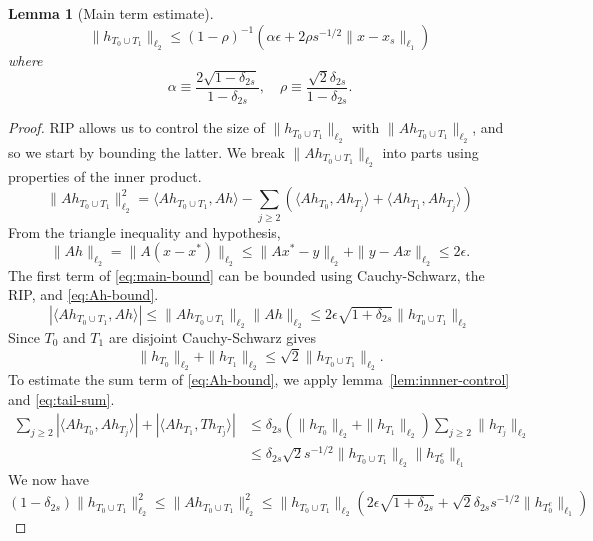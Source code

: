 \documentclass{article}
\newtheorem{lemma}[theorem]{Lemma}
\theoremstyle{definition}
\begin{document}
\begin{lemma}[Main term estimate]\label{lem:main-estimate}
\begin{equation}\label{eq:main-term-est}
\|h_{T_0\cup T_1}\|_{\ell_2} \leq (1 - \rho)^{-1}(\alpha\epsilon + 2\rho s^{-1/2}\|x - x_s\|_{\ell_1})
\end{equation}
where
$$
\alpha \equiv \frac{2\sqrt{1 - \delta_{2s}}}{1 - \delta_{2s}},\quad \rho \equiv \frac{\sqrt{2}\delta_{2s}}{1 - \delta_{2s}}.
$$
\end{lemma}
\begin{proof}
RIP allows us to control the size of $\|h_{T_0\cup T_1}\|_{\ell_2}$ with $\|Ah_{T_0\cup T_1}\|_{\ell_2}$, and so we start by bounding the latter. We break $\|Ah_{T_0\cup T_1}\|_{\ell_2}$ into parts using properties of the inner product.
\begin{equation}\label{eq:main-bound}
\|Ah_{T_0\cup T_1}\|_{\ell_2}^2 = \langle A h_{T_0\cup T_1}, Ah \rangle - \sum_{j \geq 2}\left(\langle A h_{T_0}, Ah_{T_j}\rangle + \langle Ah_{T_1}, Ah_{T_j}\rangle\right)
\end{equation}
From the triangle inequality and hypothesis,
\begin{equation}\label{eq:Ah-bound}
\|Ah\|_{\ell_2} = \|A(x - x^*)\|_{\ell_2} \leq \|Ax^* - y\|_{\ell_2} + \|y - Ax\|_{\ell_2} \leq 2\epsilon.
\end{equation}
The first term of \eqref{eq:main-bound} can be bounded using Cauchy-Schwarz, the RIP, and \eqref{eq:Ah-bound}.
\begin{equation}\label{eq:first-term-est}
|\langle Ah_{T_0\cup T_1}, Ah\rangle| \leq \|Ah_{T_0\cup T_1}\|_{\ell_2}\|Ah\|_{\ell_2} \leq 2\epsilon \sqrt{1 + \delta_{2s}}\|h_{T_0\cup T_1}\|_{\ell_2}
\end{equation}
Since $T_0$ and $T_1$ are disjoint Cauchy-Schwarz gives
$$
\|h_{T_0}\|_{\ell_2} + \|h_{T_1}\|_{\ell_2} \leq \sqrt{2}\|h_{T_0\cup T_1}\|_{\ell_2}.
$$
To estimate the sum term of \eqref{eq:Ah-bound}, we apply lemma~\ref{lem:innner-control} and \eqref{eq:tail-sum}.
\begin{align}
\sum_{j \geq 2}|\langle Ah_{T_0}, Ah_{T_j}\rangle| + |\langle Ah_{T_1}, Th_{T_j}\rangle| &\leq \delta_{2s}(\|h_{T_0}\|_{\ell_2} + \|h_{T_1}\|_{\ell_2})\sum_{j \geq 2}\|h_{T_j}\|_{\ell_2}
\nonumber\\&\leq \delta_{2s}\sqrt{2}s^{-1/2}\|h_{T_0\cup T_1}\|_{\ell_2}\|h_{T_0^c}\|_{\ell_1} \label{eq:second-term-est}
\end{align}
We now have
$$
(1 - \delta_{2s})\|h_{T_0\cup T_1}\|_{\ell_2}^2 \leq \|Ah_{T_0\cup T_1}\|_{\ell_2}^2\leq \|h_{T_0\cup T_1}\|_{\ell_2}(2\epsilon\sqrt{1 +\delta_{2s}} + \sqrt{2}\delta_{2s}s^{-1/2}\|h_{T_0^c}\|_{\ell_1})
$$
\end{proof}
\end{document}
